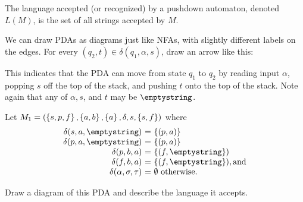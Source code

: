 \documentclass[twoside,letterpaper,openany]{book}
\begin{document}
\begin{defn}
The language accepted (or recognized) by a pushdown automaton, denoted $L(M)$, is the set of all strings accepted by $M$.

\end{defn}

\begin{discussion}
We can draw PDAs as diagrams just like NFAs, with slightly different labels on the edges. For every $(q_2, t) \in \delta(q_1, \alpha, s)$,   draw an arrow like this: 

\begin{center}
\end{center}

This indicates that the PDA can move from state $q_1$ to $q_2$ by reading input $\alpha$, popping $s$ off the top of the stack, and pushing $t$ onto the top of the stack. Note again that any of $\alpha, s$, and $t$ may be $\emptystring$.
\end{discussion}

\begin{exer1}
Let $M_1 = (\left\lbrace s, p, f \right\rbrace, \left\lbrace a, b \right\rbrace, \left\lbrace a \right\rbrace, \delta, s, \left\lbrace s, f \right\rbrace)$ where 
\[\begin{array}{r@{\ =\ }l}
\delta(s, a, \emptystring)  &  \setdef{(p, a)}  \\
\delta(p, a, \emptystring) & \setdef{(p, a)} \\
\delta(p, b, a)  & \setdef{(f, \emptystring}) \\
\delta(f, b, a) & \setdef{(f, \emptystring}), \textrm{and} \\
\delta(\alpha, \sigma, \tau) & \emptyset \ \textrm{otherwise}.
\end{array}\]

Draw a diagram of this PDA and describe the language it accepts.
\end{exer1}
\end{document}
